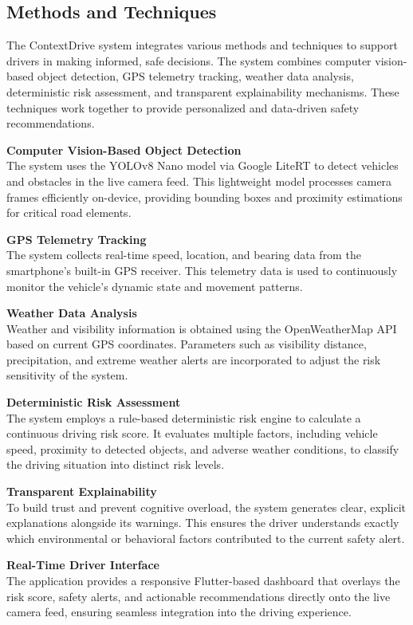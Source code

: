\subsection{Methods and Techniques}
The ContextDrive system integrates various methods and techniques to support drivers in making informed, safe decisions. The system combines computer vision-based object detection, GPS telemetry tracking, weather data analysis, deterministic risk assessment, and transparent explainability mechanisms. These techniques work together to provide personalized and data-driven safety recommendations.

\noindent\textbf{Computer Vision-Based Object Detection}\\
The system uses the YOLOv8 Nano model via Google LiteRT to detect vehicles and obstacles in the live camera feed. This lightweight model processes camera frames efficiently on-device, providing bounding boxes and proximity estimations for critical road elements.

\vspace{0.5em}
\noindent\textbf{GPS Telemetry Tracking}\\
The system collects real-time speed, location, and bearing data from the smartphone's built-in GPS receiver. This telemetry data is used to continuously monitor the vehicle's dynamic state and movement patterns.

\vspace{0.5em}
\noindent\textbf{Weather Data Analysis}\\
Weather and visibility information is obtained using the OpenWeatherMap API based on current GPS coordinates. Parameters such as visibility distance, precipitation, and extreme weather alerts are incorporated to adjust the risk sensitivity of the system.

\vspace{0.5em}
\noindent\textbf{Deterministic Risk Assessment}\\
The system employs a rule-based deterministic risk engine to calculate a continuous driving risk score. It evaluates multiple factors, including vehicle speed, proximity to detected objects, and adverse weather conditions, to classify the driving situation into distinct risk levels.

\vspace{0.5em}
\noindent\textbf{Transparent Explainability}\\
To build trust and prevent cognitive overload, the system generates clear, explicit explanations alongside its warnings. This ensures the driver understands exactly which environmental or behavioral factors contributed to the current safety alert.

\vspace{0.5em}
\noindent\textbf{Real-Time Driver Interface}\\
The application provides a responsive Flutter-based dashboard that overlays the risk score, safety alerts, and actionable recommendations directly onto the live camera feed, ensuring seamless integration into the driving experience.